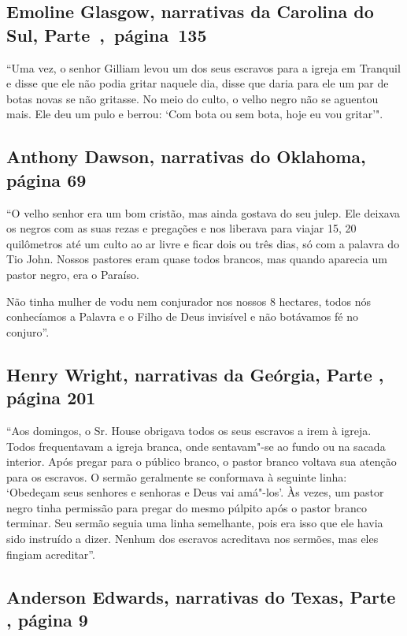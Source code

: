 \subsection{Emoline Glasgow, narrativas da Carolina do Sul, Parte~,~página~135}
\label{ref107}

``Uma vez, o senhor Gilliam levou um dos seus escravos para a igreja em
Tranquil e disse que ele não podia gritar naquele dia, disse que daria
para ele um par de botas novas se não gritasse. No meio do culto, o
velho negro não se aguentou mais. Ele deu um pulo e berrou: `Com bota ou
sem bota, hoje eu vou gritar'".

\subsection{Anthony Dawson, narrativas do Oklahoma, página 69} \label{ref70}

``O velho senhor era um bom cristão, mas ainda gostava do seu julep. Ele
deixava os negros com as suas rezas e pregações e nos liberava para
viajar 15, 20 quilômetros até um culto ao ar livre e ficar dois ou três
dias, só com a palavra do Tio John. Nossos pastores eram quase todos
brancos, mas quando aparecia um pastor negro, era o Paraíso.

Não tinha mulher de vodu nem conjurador nos nossos 8 hectares, todos nós
conhecíamos a Palavra e o Filho de Deus invisível e não botávamos fé no
conjuro''.

\subsection{Henry Wright, narrativas da Geórgia, Parte , página 201}
\label{ref320}

``Aos domingos, o Sr. House obrigava todos os seus escravos a irem à
igreja. Todos frequentavam a igreja branca, onde sentavam"-se ao fundo ou
na sacada interior. Após pregar para o público branco, o pastor branco
voltava sua atenção para os escravos. O sermão geralmente se conformava
à seguinte linha: `Obedeçam seus senhores e senhoras e Deus vai
amá"-los'. Às vezes, um pastor negro tinha permissão para pregar do mesmo
púlpito após o pastor branco terminar. Seu sermão seguia uma linha
semelhante, pois era isso que ele havia sido instruído a dizer. Nenhum
dos escravos acreditava nos sermões, mas eles fingiam acreditar''.

\subsection{Anderson Edwards, narrativas do Texas, Parte , página 9} \label{ref80}

